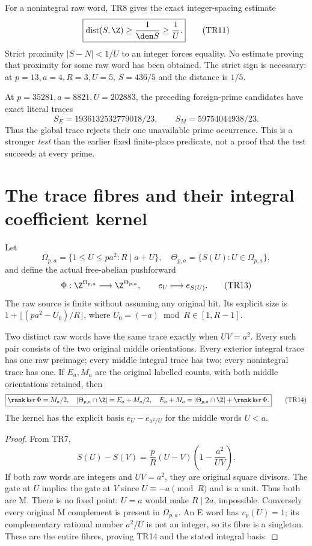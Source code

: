 For a nonintegral raw word, TR8 gives the exact integer-spacing estimate
\[
 \boxed{\operatorname{dist}(S,\Z)\ge\frac1{\den S}\ge\frac1U.}  \tag{TR11}
\]
Strict proximity $|S-N|<1/U$ to an integer forces equality. No estimate proving
that proximity for some raw word has been obtained. The strict sign is necessary:
at $p=13,a=4,R=3,U=5$, $S=436/5$ and the distance is $1/5$.

At $p=35281,a=8821,U=202883$, the preceding foreign-prime candidates have exact
literal traces
\[
 S_E=1936132532779018/23,\qquad S_M=59754044938/23.        \tag{TR12}
\]
Thus the global trace rejects their one unavailable prime occurrence. This is a
stronger \emph{test} than the earlier fixed finite-place predicate, not a proof
that the test succeeds at every prime.

\section{The trace fibres and their integral coefficient kernel}
Let
\[
 \Omega_{p,a}=\{1\le U\le pa^2:R\mid a+U\},
 \quad \Theta_{p,a}=\{S(U):U\in\Omega_{p,a}\},
\]
and define the actual free-abelian pushforward
\[
 \Phi:\Z^{\Omega_{p,a}}\longrightarrow\Z^{\Theta_{p,a}},
 \qquad e_U\longmapsto e_{S(U)}.                         \tag{TR13}
\]
The raw source is finite without assuming any original hit. Its explicit size is
$1+\lfloor(pa^2-U_0)/R\rfloor$, where $U_0=(-a)\bmod R\in[1,R-1]$.

\begin{theorem}\label{thm:fibre}
Two distinct raw words have the same trace exactly when $UV=a^2$. Every such
pair consists of the two original middle orientations. Every exterior integral
trace has one raw preimage; every middle integral trace has two; every
nonintegral trace has one. If $E_a,M_a$ are the original labelled counts, with
both middle orientations retained, then
\[
 \boxed{\rank\ker\Phi=M_a/2,\quad
 |\Theta_{p,a}\cap\Z|=E_a+M_a/2,\quad
 E_a+M_a=|\Theta_{p,a}\cap\Z|+\rank\ker\Phi.}            \tag{TR14}
\]
The kernel has the explicit basis $e_U-e_{a^2/U}$ for the middle words $U<a$.
\end{theorem}
\begin{proof}
From TR7,
\[
 S(U)-S(V)=\frac pR(U-V)\left(1-\frac{a^2}{UV}\right).  \tag{TR15}
\]
If both raw words are integers and $UV=a^2$, they are original square divisors.
The gate at $U$ implies the gate at $V$ since $U\equiv-a\pmod R$ and is a unit.
Thus both are M. There is no fixed point: $U=a$ would make $R\mid2a$, impossible.
Conversely every original M complement is present in $\Omega_{p,a}$. An E word
has $v_p(U)=1$; its complementary rational number $a^2/U$ is not an integer,
so its fibre is a singleton. These are the entire fibres, proving TR14 and
the stated integral basis.
\end{proof}

